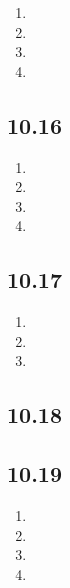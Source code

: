 \documentclass[
]{article}
\providecommand{\tightlist}{%
  \setlength{\itemsep}{0pt}\setlength{\parskip}{0pt}}
\begin{document}
\begin{enumerate}
\def\labelenumi{\alph{enumi}.}
\tightlist
\item
\item
\item
\item
\end{enumerate}

\hypertarget{section-11}{%
\subsection{10.16}\label{section-11}}

\begin{enumerate}
\def\labelenumi{\alph{enumi}.}
\tightlist
\item
\item
\item
\item
\end{enumerate}

\hypertarget{section-12}{%
\subsection{10.17}\label{section-12}}

\begin{enumerate}
\def\labelenumi{\alph{enumi}.}
\tightlist
\item
\item
\item
\end{enumerate}

\hypertarget{section-13}{%
\subsection{10.18}\label{section-13}}

\hypertarget{section-14}{%
\subsection{10.19}\label{section-14}}

\begin{enumerate}
\def\labelenumi{\alph{enumi}.}
\tightlist
\item
\item
\item
\item
\end{enumerate}
\end{document}
